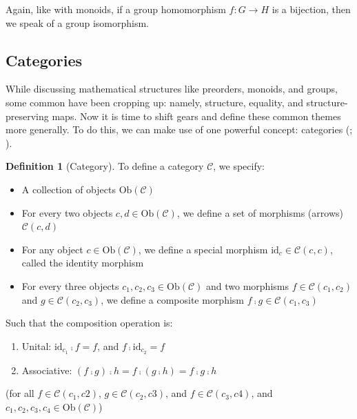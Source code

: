 \documentclass[
]{book}
\providecommand{\tightlist}{%
  \setlength{\itemsep}{0pt}\setlength{\parskip}{0pt}}
\theoremstyle{definition}
\newtheorem{definition}{Definition}[chapter]
\theoremstyle{definition}
\theoremstyle{definition}
\theoremstyle{definition}
\theoremstyle{remark}
\begin{document}
Again, like with monoids, if a group homomorphism \(f: G \to H\) is a bijection, then we speak of a group isomorphism.

\subsection{Categories}\label{categories}

While discussing mathematical structures like preorders, monoids, and groups, some common have been cropping up: namely, structure, equality, and structure-preserving maps. Now it is time to shift gears and define these common themes more generally. To do this, we can make use of one powerful concept: categories (; ).

\begin{definition}[Category]
To define a category \(\mathcal{C}\), we specify:

\begin{itemize}
\tightlist
\item
  A collection of objects \(\text{Ob}(\mathcal{C})\)
\item
  For every two objects \(c, d \in \text{Ob}(\mathcal{C})\), we define a set of morphisms (arrows) \(\mathcal{C}(c, d)\)
\item
  For any object \(c \in \text{Ob}(\mathcal{C})\), we define a special morphism \(\text{id}_c \in \mathcal{C}(c, c)\), called the identity morphism
\item
  For every three objects \(c_1, c_2, c_3 \in \text{Ob}(\mathcal{C})\) and two morphisms \(f \in \mathcal{C}(c_1, c_2)\) and \(g \in \mathcal{C}(c_2, c_3)\), we define a composite morphism \(f ⨾g \in \mathcal{C}(c_1, c_3)\)
\end{itemize}

Such that the composition operation is:

\begin{enumerate}
\def\labelenumi{\arabic{enumi}.}
\tightlist
\item
  Unital: \(\text{id}_{c_1} ⨾f = f\), and \(f ⨾\text{id}_{c_2}=f\)
\item
  Associative: \((f ⨾g) ⨾h = f ⨾(g ⨾h) = f ⨾g ⨾h\)
\end{enumerate}

(for all \(f \in \mathcal{C}(c_1, c2)\), \(g \in \mathcal{C}(c_2, c3)\), and \(f \in \mathcal{C}(c_3, c4)\), and \(c_1, c_2, c_3, c_4 \in \text{Ob}(\mathcal{C})\))
\end{definition}
\end{document}
